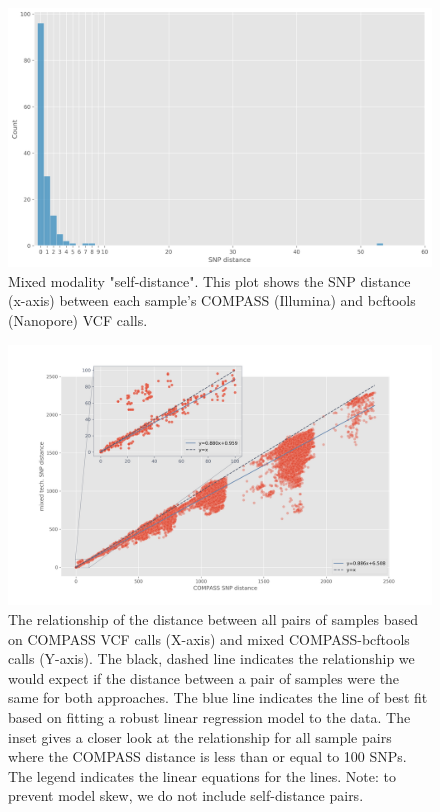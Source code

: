 \begin{figure}
\begin{center}
\includegraphics[width=0.90\columnwidth]{Chapter2/Figs/mixed_self_dist.png}
\caption{{Mixed modality "self-distance". This plot shows the SNP distance
(x-axis) between each sample's COMPASS (Illumina) and bcftools
(Nanopore) VCF calls.
{\label{166726}}%
}}
\end{center}
\end{figure}
\begin{figure}
\begin{center}
\includegraphics[width=0.90\columnwidth]{Chapter2/Figs/mixed-dotplot.png}
\caption{{The relationship of the distance between all pairs of samples based on
COMPASS VCF calls (X-axis) and mixed COMPASS-bcftools calls (Y-axis).
The black, dashed line indicates the relationship we would expect if the
distance between a pair of samples were the same for both approaches.
The blue line indicates the line of best fit based on fitting a robust
linear regression model to the data. The inset gives a closer look at
the relationship for all sample pairs where the COMPASS distance is less
than or equal to 100 SNPs. The legend indicates the linear equations for
the lines. Note: to prevent model skew, we do not include self-distance
pairs.
{\label{556408}}%
}}
\end{center}
\end{figure}
